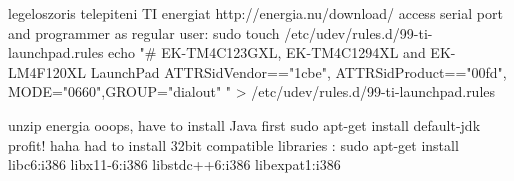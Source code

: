 legeloszoris
telepiteni TI energiat  http://energia.nu/download/
access serial port and programmer as regular user:
sudo touch  /etc/udev/rules.d/99-ti-launchpad.rules
echo "# EK-TM4C123GXL, EK-TM4C1294XL and EK-LM4F120XL LaunchPad
		ATTRS{idVendor}=="1cbe", ATTRS{idProduct}=="00fd", MODE="0660",GROUP="dialout"
	" > /etc/udev/rules.d/99-ti-launchpad.rules

unzip energia
ooops, have to install Java first
sudo apt-get install default-jdk
profit!
haha
had to install 32bit compatible libraries :
sudo apt-get install libc6:i386 libx11-6:i386 libstdc++6:i386 libexpat1:i386


